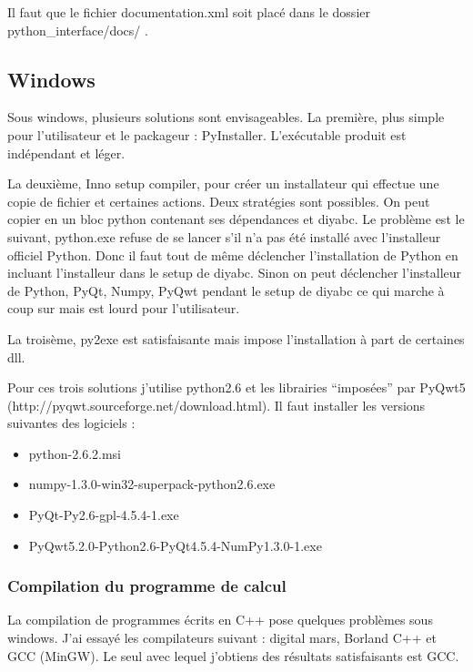 \documentclass[12pt,a4paper]{article}
\begin{document}
    Il faut que le fichier documentation.xml soit placé dans le dossier python\_interface/docs/ .

    
    \subsection{Windows}
        Sous windows, plusieurs solutions sont envisageables. La première, plus
        simple pour l'utilisateur et le packageur : PyInstaller. L'ex\'ecutable
        produit est ind\'ependant et l\'eger. \newline

        La deuxième, Inno setup compiler, pour cr\'eer un installateur qui
        effectue une copie de fichier et certaines actions.  Deux strat\'egies
        sont possibles. On peut copier en un bloc python contenant ses
        d\'ependances et diyabc. Le problème est le suivant, python.exe refuse
        de se lancer s'il n'a pas \'et\'e install\'e avec l'installeur officiel
        Python. Donc il faut tout de même d\'eclencher l'installation de Python
        en incluant l'installeur dans le setup de diyabc. Sinon on peut
        d\'eclencher l'installeur de Python, PyQt, Numpy, PyQwt pendant le setup
        de diyabc ce qui marche à coup sur mais est lourd pour
        l'utilisateur.\newline
        
        La troisème, py2exe est satisfaisante mais impose l'installation à part
        de certaines dll.\newline

        Pour ces trois solutions j'utilise python2.6 et les librairies
        ``impos\'ees'' par PyQwt5 (http://pyqwt.sourceforge.net/download.html).
        Il faut installer les versions suivantes des logiciels :
        \begin{itemize}
            \item python-2.6.2.msi
            \item numpy-1.3.0-win32-superpack-python2.6.exe
            \item PyQt-Py2.6-gpl-4.5.4-1.exe
            \item PyQwt5.2.0-Python2.6-PyQt4.5.4-NumPy1.3.0-1.exe
        \end{itemize}

        \subsubsection{Compilation du programme de calcul}
        La compilation de programmes écrits en C++ pose quelques problèmes sous
        windows. J'ai essayé les compilateurs suivant : 
        digital mars, Borland C++ et GCC (MinGW). Le seul avec lequel j'obtiens
        des résultats satisfaisants est GCC. 
\end{document}

